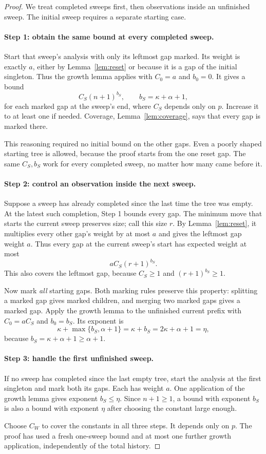 \documentclass[11pt,a4paper]{article}
\theoremstyle{readable}
\begin{document}
\begin{proof}
We treat completed sweeps first, then observations inside an unfinished
sweep. The initial sweep requires a separate starting case.

\paragraph{Step 1: obtain the same bound at every completed sweep.}
Start that sweep's analysis with only its leftmost gap marked.
Its weight is exactly $a$, either by Lemma~\ref{lem:reset} or
because it is a gap of the initial singleton. Thus the growth lemma
applies with $C_0=a$ and $b_0=0$. It gives a bound
\[
  C_S(n+1)^{b_S},\qquad b_S=\kappa+\alpha+1,
\]
for each marked gap at the sweep's end, where $C_S$ depends only on
$p$. Increase it to at least one if needed. Coverage,
Lemma~\ref{lem:coverage}, says that every gap is marked there.

This reasoning required no initial bound on the other gaps. Even a
poorly shaped starting tree is allowed, because the proof starts
from the one reset gap. The same $C_S,b_S$ work for every completed
sweep, no matter how many came before it.

\paragraph{Step 2: control an observation inside the next sweep.}
Suppose a sweep has already completed since the last time the tree
was empty. At the latest such completion, Step 1 bounds every gap.
The minimum move that starts the current sweep preserves size; call
this size $r$. By Lemma~\ref{lem:reset}, it multiplies every other
gap's weight by at most $a$ and gives the leftmost gap weight $a$.
Thus every gap at the current sweep's start has expected weight at
most
\[
  a C_S(r+1)^{b_S}.
\]
This also covers the leftmost gap, because $C_S\ge1$ and
$(r+1)^{b_S}\ge1$.

Now mark \emph{all} starting gaps. Both marking rules preserve this
property: splitting a marked gap gives marked children, and merging
two marked gaps gives a marked gap. Apply the growth lemma to the
unfinished current prefix with $C_0=aC_S$ and $b_0=b_S$. Its exponent
is
\[
  \kappa+\max\{b_S,\alpha+1\}
    =\kappa+b_S=2\kappa+\alpha+1=\eta,
\]
because $b_S=\kappa+\alpha+1\ge\alpha+1$.

\paragraph{Step 3: handle the first unfinished sweep.}
If no sweep has completed since the last empty tree, start the
analysis at the first singleton and mark both its gaps. Each has
weight $a$. One application of the growth lemma gives exponent
$b_S\le\eta$. Since $n+1\ge1$, a bound with exponent $b_S$ is also
a bound with exponent $\eta$ after choosing the constant large enough.

Choose $C_W$ to cover the constants in all three steps. It depends
only on $p$. The proof has used a fresh one-sweep bound and at most
one further growth application, independently of the total history.\qedhere
\end{proof}
\end{document}
